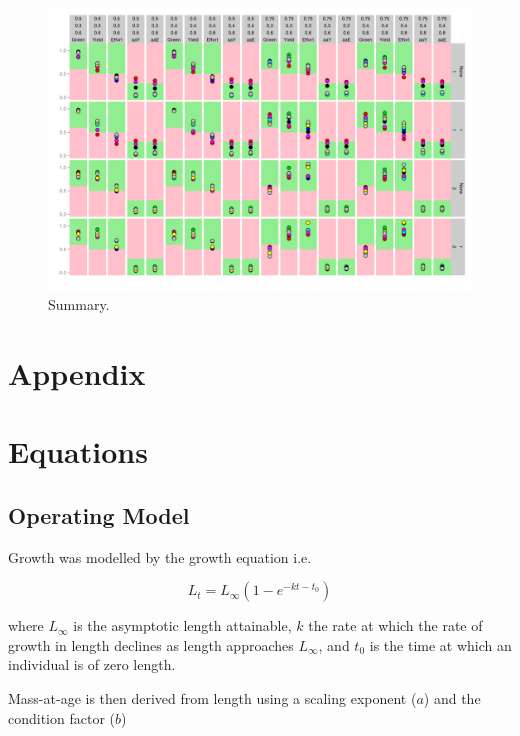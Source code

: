 \documentclass[%
nonumbib,      %
%
]{nrc1}                          %
\begin{document}
\begin{figure}[htbp]
\centering
\includegraphics[width=6in]{ssSmry.png}
\caption{Summary.}
\label{fig:smry}
\end{figure}


\newpage\clearpage
\section{Appendix}

\newpage\clearpage
\section*{Equations}

\subsection*{Operating Model}

Growth was modelled by the \cite{vonbert1957quantitative} growth equation i.e.
 
\begin{equation} L_t = L_{\infty}(1 - e^{-kt-t_0}) \end{equation} 
 
where $L_{\infty}$ is the asymptotic length attainable, $k$ the rate at which the rate of growth in length declines as length approaches
$L_{\infty}$, and $t_{0}$ is the time at which an individual is of zero length. 
 
Mass-at-age is then derived from length using a scaling exponent ($a$) and the condition factor ($b$)
 
\end{document}
